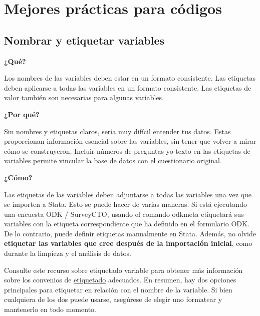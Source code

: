 \documentclass[11pt,en]{elegantpaper}
\begin{document}
\newpage 
\section{Mejores prácticas para códigos}
\label{sec:practicas}

\subsection{Nombrar y etiquetar variables}
\label{sec:variables}
\noindent
\textbf{¿Qué?}

Los nombres de las variables deben estar en un formato consistente. Las etiquetas deben aplicarse a todas las variables en un formato consistente. Las etiquetas de valor también son necesarias para algunas variables.

\noindent
\textbf{¿Por qué?} 

Sin nombres y etiquetas claros, sería muy difícil entender tus datos. Estas proporcionan información esencial sobre las variables, sin tener que volver a mirar cómo se construyeron. Incluir números de preguntas y\/o texto en las etiquetas de variables permite vincular la base de datos con el cuestionario original.

\noindent
\textbf{¿Cómo?} 

Las etiquetas de las variables deben adjuntarse a todas las variables una vez que se importen a Stata. Esto se puede hacer de varias maneras. Si está ejecutando una encuesta ODK / SurveyCTO, usando el comando odkmeta etiquetará sus variables con la etiqueta correspondiente que ha definido en el formulario ODK. De lo contrario, puede definir etiquetas manualmente en Stata. Además, no olvide \textbf{etiquetar las variables que cree después de la importación inicial}, como durante la limpieza y el análisis de datos.

Consulte este recurso sobre etiquetado variable para obtener más información sobre los convenios de \href{https://www.poverty-action.org/sites/default/files/Naming-and-Labeling-Data.pdf}{etiquetado} adecuados. En resumen, hay dos opciones principales para etiquetar en relación con el nombre de la variable. Si bien cualquiera de los dos puede usarse, asegúrese de elegir uno formatear y mantenerlo en todo momento.
\end{document}
